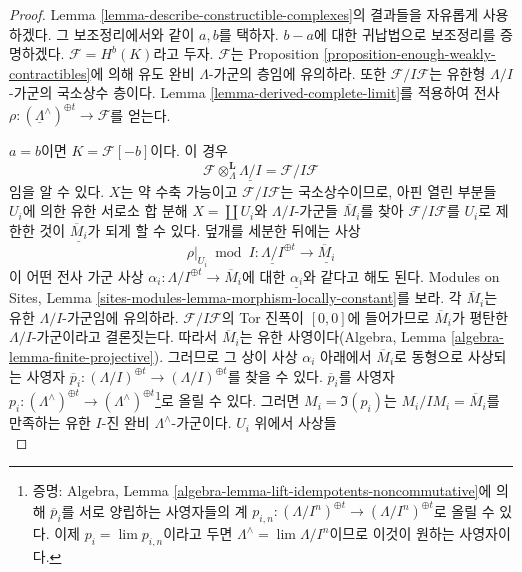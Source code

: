 \begin{proof}
Lemma \ref{lemma-describe-constructible-complexes}의 결과들을 자유롭게
사용하겠다. 그 보조정리에서와 같이 $a, b$를 택하자. $b - a$에 대한
귀납법으로 보조정리를 증명하겠다. $\mathcal{F} = H^b(K)$라고 두자.
$\mathcal{F}$는 Proposition
\ref{proposition-enough-weakly-contractibles}에 의해 유도 완비
$\Lambda$-가군의 층임에 유의하라. 또한
$\mathcal{F}/I\mathcal{F}$는 유한형 $\Lambda/I$-가군의 국소상수
층이다. Lemma \ref{lemma-derived-complete-limit}를 적용하여 전사
$\rho : (\underline{\Lambda}^\wedge)^{\oplus t} \to \mathcal{F}$를
얻는다.

\medskip\noindent
$a = b$이면 $K = \mathcal{F}[-b]$이다. 이 경우
$$
\mathcal{F} \otimes_\Lambda^\mathbf{L} \underline{\Lambda/I} =
\mathcal{F}/I\mathcal{F}
$$
임을 알 수 있다. $X$는 약 수축 가능이고
$\mathcal{F}/I\mathcal{F}$는 국소상수이므로, 아핀 열린 부분들
$U_i$에 의한 유한 서로소 합 분해 $X = \coprod U_i$와
$\Lambda/I$-가군들 $\overline{M}_i$를 찾아
$\mathcal{F}/I\mathcal{F}$를 $U_i$로 제한한 것이
$\underline{\overline{M}_i}$가 되게 할 수 있다. 덮개를 세분한 뒤에는
사상
$$
\rho|_{U_i} \bmod I :
\underline{\Lambda/I}^{\oplus t}
\longrightarrow
\underline{\overline{M}_i}
$$
이 어떤 전사 가군 사상
$\alpha_i : \Lambda/I^{\oplus t} \to \overline{M}_i$에 대한
$\underline{\alpha_i}$와 같다고 해도 된다. Modules on Sites, Lemma
\ref{sites-modules-lemma-morphism-locally-constant}를 보라. 각
$\overline{M}_i$는 유한 $\Lambda/I$-가군임에 유의하라.
$\mathcal{F}/I\mathcal{F}$의 Tor 진폭이 $[0, 0]$에 들어가므로
$\overline{M}_i$가 평탄한 $\Lambda/I$-가군이라고 결론짓는다. 따라서
$\overline{M}_i$는 유한 사영이다(Algebra, Lemma
\ref{algebra-lemma-finite-projective}). 그러므로 그 상이 사상
$\alpha_i$ 아래에서 $\overline{M}_i$로 동형으로 사상되는 사영자
$\overline{p}_i : (\Lambda/I)^{\oplus t} \to (\Lambda/I)^{\oplus t}$를
찾을 수 있다. $\overline{p}_i$를 사영자
$p_i : (\Lambda^\wedge)^{\oplus t} \to
(\Lambda^\wedge)^{\oplus t}$\footnote{증명: Algebra, Lemma
\ref{algebra-lemma-lift-idempotents-noncommutative}에 의해
$\overline{p}_i$를 서로 양립하는 사영자들의 계
$p_{i, n} : (\Lambda/I^n)^{\oplus t} \to (\Lambda/I^n)^{\oplus t}$로
올릴 수 있다. 이제 $p_i = \lim p_{i, n}$이라고 두면
$\Lambda^\wedge = \lim \Lambda/I^n$이므로 이것이 원하는 사영자이다.}로
올릴 수 있다. 그러면 $M_i = \Im(p_i)$는
$M_i/IM_i = \overline{M}_i$를 만족하는 유한 $I$-진 완비
$\Lambda^\wedge$-가군이다. $U_i$ 위에서 사상들
$$
$$
\end{proof}
